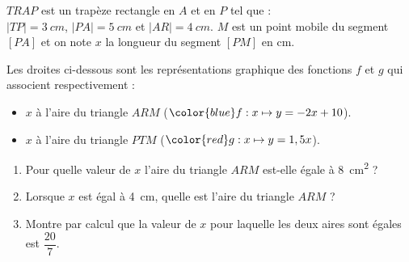 %
%
    \begin{minipage}{.48\linewidth}
        
    \end{minipage}
    \begin{minipage}{.48\linewidth}
        $TRAP$ est un trapèze rectangle en $A$ et en $P$ tel que :\\
    $|TP| = \SI{3}{cm}$, $|PA| = \SI{5}{cm}$ et $|AR|=\SI{4}{cm}$.\medbreak
    $M$ est un point mobile du segment $[PA]$ et on note $x$ la longueur du segment $[PM]$ en cm.
    \end{minipage}


    Les droites ci-dessous sont les représentations graphique des fonctions $f$ et $g$ qui associent respectivement :
    \begin{itemize}[label=]
        \item $x$ à l'aire du triangle $ARM$ ($\color{blue}f:x\mapsto y= -2x+10$).
        \item $x$ à l'aire du triangle $PTM$ ($\color{red}g:x\mapsto y=1,5x$).
    \end{itemize}

    

    \begin{enumerate}[resume=mine]
        \item Pour quelle valeur de $x$ l'aire du triangle $ARM$ est-elle égale à \SI{8}{cm^2} ?
        \item Lorsque $x$ est égal à \SI{4}{cm}, quelle est l'aire du triangle $ARM$ ?
        \item Montre par calcul que la valeur de $x$ pour laquelle les deux aires sont égales est $\dfrac{20}{7}$.
    \end{enumerate}
